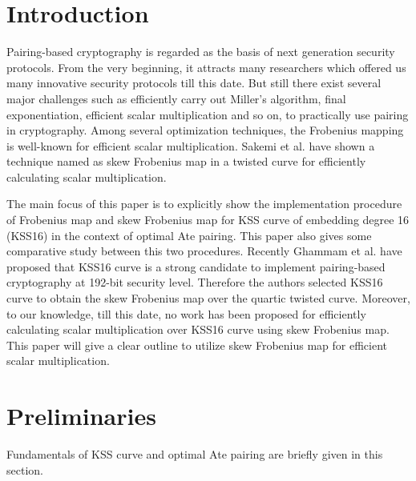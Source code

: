 \section{Introduction}
Pairing-based cryptography is regarded as the basis of next generation security protocols. From the very beginning, it attracts many researchers which offered us many innovative security protocols till this date. 
But still there exist several major challenges such as efficiently carry out Miller's algorithm, final exponentiation, efficient scalar multiplication and so on, to practically use pairing in cryptography. Among several optimization techniques,  the Frobenius mapping is well-known for efficient scalar multiplication. Sakemi et al. \cite{sakemi_skew} have shown a technique named as skew Frobenius map in a twisted curve for efficiently calculating scalar multiplication.

The main focus of this paper is to explicitly show the implementation procedure of  Frobenius map and skew Frobenius map for KSS curve of embedding degree 16 (KSS16) in the context of optimal Ate pairing. This paper also gives some comparative study between this two procedures. Recently Ghammam et al. \cite{kss_lub} have proposed that KSS16 curve is a strong candidate to implement pairing-based cryptography at 192-bit security level. Therefore the authors selected KSS16 curve to obtain the skew Frobenius map over the quartic twisted curve. Moreover, to our knowledge, till this date, no work has been proposed for efficiently calculating scalar multiplication over KSS16 curve using skew Frobenius map. This paper will give a clear outline to utilize skew Frobenius map for efficient scalar multiplication.

\section{Preliminaries}
Fundamentals of KSS curve and  optimal Ate pairing are briefly given in this section.
